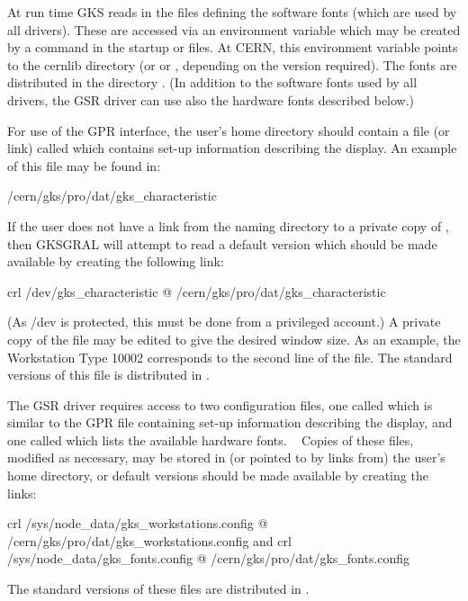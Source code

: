 At run time GKS reads in the files defining the software fonts (which are
used by all drivers). These are accessed via an environment variable
 which may be created by a command in the 
startup or  files.
At CERN, this environment variable points to the cernlib directory
 (or  or , 
depending on the version
required). The fonts are distributed in the directory
.
(In addition to the software fonts used by all drivers, the GSR driver
can use also the hardware fonts described below.)
 
For use of the GPR interface, the user's home directory should contain a
file (or link) called  which contains set-up
information describing the display. An example of this file may be found in:
\begin{XMP}
/cern/gks/pro/dat/gks_characteristic
\end{XMP}
If the user does not have a link from the naming directory to a
private copy of , then GKSGRAL will attempt to read a
default version which should be made available by creating the
following link:
\begin{XMP}
crl   /dev/gks_characteristic                   @
      /cern/gks/pro/dat/gks_characteristic
\end{XMP}
 
(As /dev is protected, this must be done from a privileged account.)
A private copy of the file may be edited to give the
desired window size. As an example, the Workstation Type 10002
corresponds to the second line of the file.
The standard versions of this file is distributed in
.
 
The GSR driver requires access to two configuration files, one called
 which is similar to the GPR
 file containing set-up information describing
the display, and one called  which lists
the available hardware fonts. ~
Copies of these files, modified as necessary,
may be stored in (or pointed to by links from) the user's home directory,
or default versions should be made available by creating the links:
\begin{XMP}
crl /sys/node_data/gks_workstations.config       @
    /cern/gks/pro/dat/gks_workstations.config
      and
crl /sys/node_data/gks_fonts.config              @
    /cern/gks/pro/dat/gks_fonts.config
\end{XMP}
The standard versions of these files are distributed in
.
 
